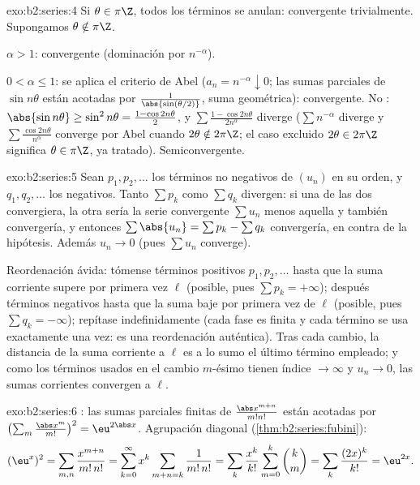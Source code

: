 \begin{solution}{exo:b2:series:4}
Si $\theta \in \pi\Z$, todos los términos se anulan: convergente
trivialmente. Supongamos $\theta \notin \pi\Z$.

$\alpha > 1$:  convergente (dominación por
$n^{-\alpha}$).

$0 < \alpha \leq 1$: se aplica el criterio de Abel ($a_n =
n^{-\alpha} \downarrow 0$; las sumas parciales de $\sin n\theta$
están acotadas por $\frac{1}{\abs{\sin(\theta/2)}}$, suma
geométrica): convergente. No : $\abs{\sin n\theta} \geq
\sin^2 n\theta = \frac{1 - \cos 2n\theta}{2}$, y $\sum \frac{1 -
\cos 2n\theta}{2n^\alpha}$ diverge ($\sum n^{-\alpha}$ diverge y
$\sum \frac{\cos 2n\theta}{n^\alpha}$ converge por Abel cuando
$2\theta \notin 2\pi\Z$; el caso excluido $2\theta \in 2\pi\Z$
significa $\theta \in \pi\Z$, ya tratado). Semiconvergente.
\end{solution}

\begin{solution}{exo:b2:series:5}
Sean $p_1, p_2, \dots$ los términos no negativos de $(u_n)$ en su
orden, y $q_1, q_2, \dots$ los negativos. Tanto $\sum p_k$ como
$\sum q_k$ divergen: si una de las dos convergiera, la otra sería la
serie convergente $\sum u_n$ menos aquella y también convergería, y
entonces $\sum \abs{u_n} = \sum p_k - \sum q_k$ convergería, en
contra de la hipótesis. Además $u_n \to 0$ (pues $\sum u_n$
converge).

Reordenación ávida: tómense términos positivos $p_1, p_2, \dots$
hasta que la suma corriente supere por primera vez $\ell$ (posible,
pues $\sum p_k = +\infty$); después términos negativos hasta que la
suma baje por primera vez de $\ell$ (posible, pues $\sum q_k =
-\infty$); repítase indefinidamente (cada fase es finita y cada
término se usa exactamente una vez: es una reordenación auténtica).
Tras cada cambio, la distancia de la suma corriente a $\ell$ es a lo
sumo el último término empleado; y como los términos usados en el
cambio $m$-ésimo tienen índice $\to \infty$ y $u_n \to 0$, las sumas
corrientes convergen a $\ell$.
\end{solution}

\begin{solution}{exo:b2:series:6}
: las sumas parciales finitas de $\frac{\abs
x^{m+n}}{m!n!}$ están acotadas por $\bigl(\sum_m \frac{\abs
x^m}{m!}\bigr)^2 = \eu^{2\abs x}$. Agrupación diagonal
(\cref{thm:b2:series:fubini}):
\[
(\eu^{x})^2 = \sum_{m,n} \frac{x^{m+n}}{m!\,n!}
= \sum_{k=0}^{\infty} x^k \sum_{m+n=k} \frac{1}{m!\,n!}
= \sum_k \frac{x^k}{k!}\sum_{m=0}^{k}\binom km
= \sum_k \frac{(2x)^k}{k!} = \eu^{2x} .
\]
\end{solution}

